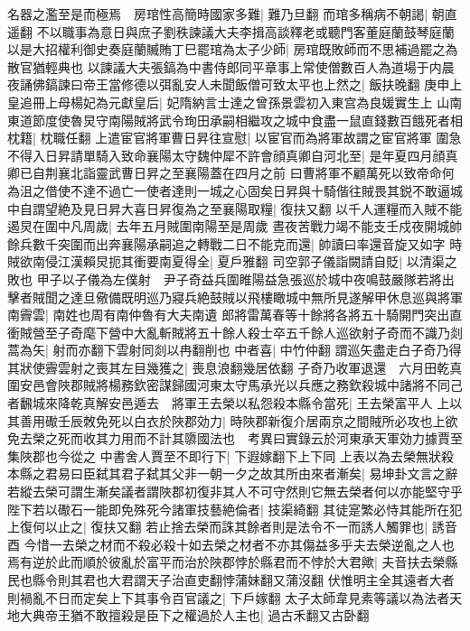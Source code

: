 名器之濫至是而極焉　房琯性高簡時國家多難|{
	難乃旦翻}
而琯多稱病不朝謁|{
	朝直遥翻}
不以職事為意日與庶子劉秩諫議大夫李揖高談釋老或聽門客董庭蘭鼓琴庭蘭以是大招權利御史奏庭蘭贓賄丁巳罷琯為太子少師|{
	房琯既敗師而不思補過罷之為散官猶輕典也}
以諫議大夫張鎬為中書侍郎同平章事上常使僧數百人為道場于内晨夜誦佛鎬諫曰帝王當修德以弭亂安人未聞飯僧可致太平也上然之|{
	飯扶晚翻}
庚申上皇追冊上母楊妃為元獻皇后|{
	妃隋納言士達之曾孫景雲初入東宫為良媛實生上}
山南東道節度使魯炅守南陽賊將武令珣田承嗣相繼攻之城中食盡一鼠直錢數百餓死者相枕籍|{
	枕職任翻}
上遣宦官將軍曹日昇往宣慰|{
	以宦官而為將軍故謂之宦官將軍}
圍急不得入日昇請單騎入致命襄陽太守魏仲犀不許會顔真卿自河北至|{
	是年夏四月顔真卿已自荆襄北詣靈武曹日昇之至襄陽蓋在四月之前}
曰曹將軍不顧萬死以致帝命何為沮之借使不達不過亡一使者達則一城之心固矣日昇與十騎偕往賊畏其鋭不敢逼城中自謂望絶及見日昇大喜日昇復為之至襄陽取糧|{
	復扶又翻}
以千人運糧而入賊不能遏炅在圍中凡周歲|{
	去年五月賊圍南陽至是周歲}
晝夜苦戰力竭不能支壬戍夜開城帥餘兵數千突圍而出奔襄陽承嗣追之轉戰二日不能克而還|{
	帥讀曰率還音旋又如字}
時賊欲南侵江漢賴炅扼其衝要南夏得全|{
	夏戶雅翻}
司空郭子儀詣闕請自貶|{
	以清渠之敗也}
甲子以子儀為左僕射　尹子奇益兵圍睢陽益急張巡於城中夜鳴鼓嚴隊若將出擊者賊聞之達旦儆備既明巡乃寢兵絶鼓賊以飛樓瞰城中無所見遂解甲休息巡與將軍南霽雲|{
	南姓也周有南仲魯有大夫南遺}
郎將雷萬春等十餘將各將五十騎開門突出直衝賊營至子奇麾下營中大亂斬賊將五十餘人殺士卒五千餘人巡欲射子奇而不識乃剡蒿為矢|{
	射而亦翻下雲射同剡以冉翻削也}
中者喜|{
	中竹仲翻}
謂巡矢盡走白子奇乃得其狀使霽雲射之喪其左目幾獲之|{
	喪息浪翻幾居依翻}
子奇乃收軍退還　六月田乾真圍安邑會陜郡賊將楊務欽密謀歸國河東太守馬承光以兵應之務欽殺城中諸將不同己者飜城來降乾真解安邑遁去　將軍王去榮以私怨殺本縣令當死|{
	王去榮富平人}
上以其善用礮壬辰敇免死以白衣於陜郡効力|{
	時陜郡新復介居兩京之間賊所必攻也上欲免去榮之死而收其力用而不計其隳國法也　考異曰實錄云於河東承天軍効力據賈至集陜郡也今從之}
中書舍人賈至不即行下|{
	下遐嫁翻下上下同}
上表以為去榮無狀殺本縣之君易曰臣弑其君子弑其父非一朝一夕之故其所由來者漸矣|{
	易坤卦文言之辭}
若縱去榮可謂生漸矣議者謂陜郡初復非其人不可守然則它無去榮者何以亦能堅守乎陛下若以礮石一能即免殊死今諸軍技藝絶倫者|{
	技渠綺翻}
其徒寔繁必恃其能所在犯上復何以止之|{
	復扶又翻}
若止捨去榮而誅其餘者則是法令不一而誘人觸罪也|{
	誘音酉}
今惜一去榮之材而不殺必殺十如去榮之材者不亦其傷益多乎夫去榮逆亂之人也焉有逆於此而順於彼亂於富平而治於陜郡悖於縣君而不悖於大君歟|{
	夫音扶去榮縣民也縣令則其君也大君謂天子治直吏翻悖蒲妹翻又蒲沒翻}
伏惟明主全其遠者大者則禍亂不日而定矣上下其事令百官議之|{
	下戶嫁翻}
太子太師韋見素等議以為法者天地大典帝王猶不敢擅殺是臣下之權過於人主也|{
	過古禾翻又古卧翻}
